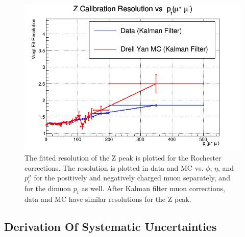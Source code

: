 \begin{figure}[!h]
  \includegraphics[width=0.32\linewidth]{images/muon_calib/zcal_kamu_mc-data_res_dimu_pt.png}
  \caption[The Z peak resolution's alignment in data and MC after Kalman Filter corrections.]
   {The fitted resolution of the Z peak is plotted for the Rochester corrections. The resolution is plotted in data and MC vs. $\phi$, $\eta$, and $p_t^\mu$ for the positively and negatively charged muon separately, and for the dimuon $p_t$ as well. After Kalman filter muon corrections, data and MC have similar resolutions for the Z peak.}
  \label{fig:data_mc_kamu_res_after}
\end{figure}

\FloatBarrier
\subsection{Derivation Of Systematic Uncertainties}

